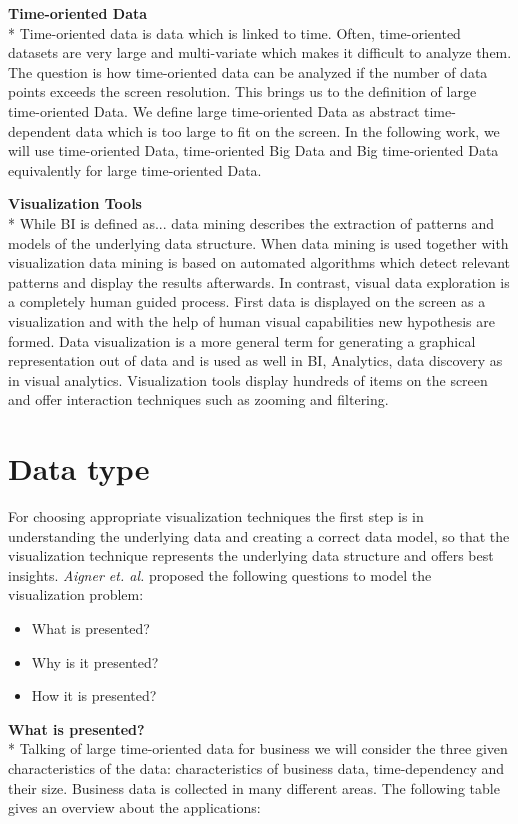 \textbf{Time-oriented Data}\\*
Time-oriented data is data which is linked to time\cite{Aigner2011}. Often, time-oriented datasets are very large and multi-variate which makes it difficult to analyze them. The question is how time-oriented data can be analyzed if the number of data points exceeds the screen resolution. This brings us to the definition of large time-oriented Data. 
We define large time-oriented Data as abstract time-dependent data which is too large to fit on the screen. \cite{Shneiderman2008} 
In the following work, we will use time-oriented Data, time-oriented Big Data and Big time-oriented Data equivalently for large time-oriented Data. 




\textbf{Visualization Tools}\\*
While BI is defined as... data mining describes the extraction of patterns and models of the underlying data structure\cite{FerreiradeOliveira2003}. When data mining is used together with visualization data mining is based on automated algorithms which detect relevant patterns and display the results afterwards. In contrast, visual data exploration is a completely human guided process\cite{FerreiradeOliveira2003}. First data is displayed on the screen as a visualization and with the help of human visual capabilities new hypothesis are formed. Data visualization is a more general term for generating a graphical representation out of data and is used as well in BI, Analytics, data discovery as in visual analytics. 
Visualization tools display hundreds of items on the screen and offer interaction techniques such as zooming and filtering\cite{Shneiderman2008}.


\section{Data type} \label{data}

For choosing appropriate visualization techniques the first step is in understanding the underlying data and creating a correct data model\cite{Aigner2011}, so that the visualization technique represents the underlying data structure and offers best insights\cite{Bacic}. \textit{Aigner et. al.} proposed  the following questions to model the visualization problem: 

\begin{itemize}
    \item What is presented?
    \item Why is it presented?
    \item How it is presented?
\end{itemize}
\textbf{What is presented?}\\*
Talking of large time-oriented data for business we will consider the three given characteristics of the data: characteristics of business data, time-dependency and their size. Business data is collected in many different areas. The following table gives an overview about the applications: 

